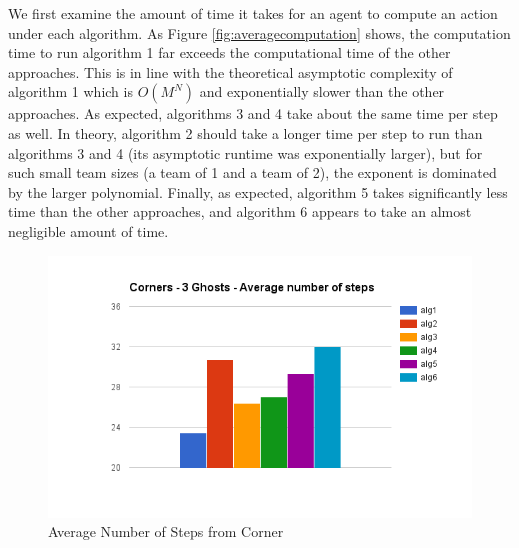 \documentclass[11pt]{article}
\begin{document}
We first examine the amount of time it takes for an agent to compute an action under each algorithm. As Figure \ref{fig:averagecomputation} shows, the computation time to run algorithm 1 far exceeds the computational time of the other approaches. This is in line with the theoretical asymptotic complexity of algorithm 1 which is $O(M^N)$ and exponentially slower than the other approaches. As expected, algorithms 3 and 4 take about the same time per step as well. In theory, algorithm 2 should take a longer time per step to run than algorithms 3 and 4 (its asymptotic runtime was exponentially larger), but for such small team sizes (a team of 1 and a team of 2), the exponent is dominated by the larger polynomial. Finally, as expected, algorithm 5 takes significantly less time than the other approaches, and algorithm 6 appears to take an almost negligible amount of time. 



\begin{figure}[H]
	\includegraphics[scale=0.45]{cornersteps.png}
	\caption{Average Number of Steps from Corner}
	\label{fig:averagenumstepscorner}
\end{figure}
\end{document}
